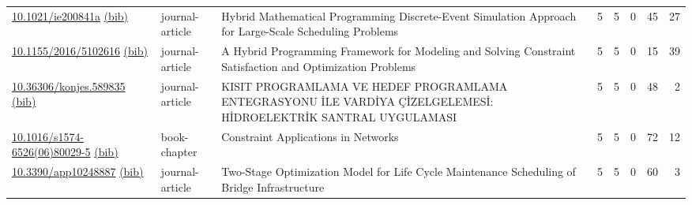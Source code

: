 {\begin{longtable}{p{5cm}lp{11cm}rrrrr}
\href{http://dx.doi.org/10.1021/ie200841a}{10.1021/ie200841a} \href{https://www.doi2bib.org/bib/10.1021/ie200841a}{(bib)} & journal-article & Hybrid Mathematical Programming Discrete-Event Simulation Approach for Large-Scale Scheduling Problems & 5 & 5 & 0 & 45 & 27 \\
\href{http://dx.doi.org/10.1155/2016/5102616}{10.1155/2016/5102616} \href{https://www.doi2bib.org/bib/10.1155/2016/5102616}{(bib)} & journal-article & A Hybrid Programming Framework for Modeling and Solving Constraint Satisfaction and Optimization Problems & 5 & 5 & 0 & 15 & 39 \\
\href{http://dx.doi.org/10.36306/konjes.589835}{10.36306/konjes.589835} \href{https://www.doi2bib.org/bib/10.36306/konjes.589835}{(bib)} & journal-article & KISIT PROGRAMLAMA VE HEDEF PROGRAMLAMA ENTEGRASYONU İLE VARDİYA ÇİZELGELEMESİ: HİDROELEKTRİK SANTRAL UYGULAMASI & 5 & 5 & 0 & 48 & 2 \\
\href{http://dx.doi.org/10.1016/s1574-6526(06)80029-5}{10.1016/s1574-6526(06)80029-5} \href{https://www.doi2bib.org/bib/10.1016/s1574-6526(06)80029-5}{(bib)} & book-chapter & Constraint Applications in Networks & 5 & 5 & 0 & 72 & 12 \\
\href{http://dx.doi.org/10.3390/app10248887}{10.3390/app10248887} \href{https://www.doi2bib.org/bib/10.3390/app10248887}{(bib)} & journal-article & Two-Stage Optimization Model for Life Cycle Maintenance Scheduling of Bridge Infrastructure & 5 & 5 & 0 & 60 & 3 \\
\end{longtable}
}

